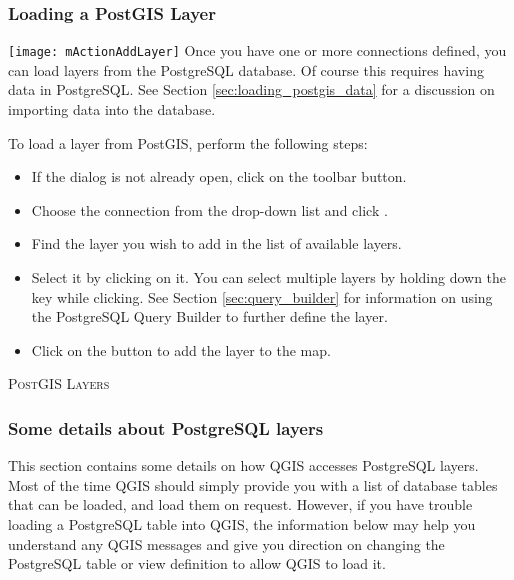 \subsubsection{Loading a PostGIS Layer}

\texttt{[image: mActionAddLayer]} Once you have one or more
connections defined, you can load layers from the PostgreSQL database. Of
course this requires having data in PostgreSQL. See Section
\ref{sec:loading_postgis_data} for a discussion on importing data into the
database. 

To load a layer from PostGIS, perform the following steps:

\begin{itemize}
\item If the  dialog is not already open, click on the
 toolbar button.
\item Choose the connection from the drop-down list and click .
\item Find the layer you wish to add in the list of available layers.
\item Select it by clicking on it. You can select multiple layers by holding
down the  key while clicking. See Section \ref{sec:query_builder} for
information on using the PostgreSQL Query Builder to further define the layer.
\item Click on the  button to add the layer to the map.
\end{itemize}

\begin{Tip}\caption{\textsc{PostGIS Layers}}
\end{Tip}

\subsubsection{Some details about PostgreSQL
layers}\label{sec:postgis_details}

This section contains some details on how QGIS accesses PostgreSQL
layers. Most of the time QGIS should simply provide you with a list of
database tables that can be loaded, and load them on request. However,
if you have trouble loading a PostgreSQL table into QGIS, the information
below may help you understand any QGIS messages and give you direction on
changing the PostgreSQL table or view definition to allow QGIS to load it.

